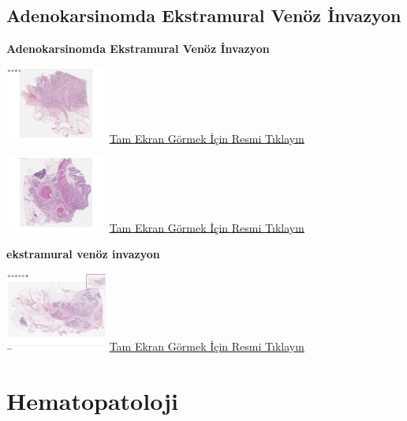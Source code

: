 \documentclass[
  letterpaper,
  DIV=11,
  numbers=noendperiod]{scrreprt}
\begin{document}
\hypertarget{sec-adenokarsinomda-ekstramural-venoz-invazyon}{%
\chapter{Adenokarsinomda Ekstramural Venöz
İnvazyon}\label{sec-adenokarsinomda-ekstramural-venoz-invazyon}}

\textbf{Adenokarsinomda Ekstramural Venöz İnvazyon}

\href{https://images.patolojiatlasi.com/extramuralvenousinvasion/HE.html}{\includegraphics[width=0.25\textwidth,height=\textheight]{./screenshots/extramuralvenousinvasion_screenshot.png}}
\href{https://images.patolojiatlasi.com/extramuralvenousinvasion/HE.html}{Tam
Ekran Görmek İçin Resmi Tıklayın}

\href{https://images.patolojiatlasi.com/extramuralvenousinvasion/HE2.html}{\includegraphics[width=0.25\textwidth,height=\textheight]{./screenshots/extramuralvenousinvasion-2_screenshot.png}}
\href{https://images.patolojiatlasi.com/extramuralvenousinvasion/HE2.html}{Tam
Ekran Görmek İçin Resmi Tıklayın}

\textbf{ekstramural venöz invazyon}

\href{https://images.patolojiatlasi.com/extramural-venous-invasion/HE.html}{\includegraphics[width=0.25\textwidth,height=\textheight]{./screenshots/extramural-venous-invasion_screenshot.png}}
\href{https://images.patolojiatlasi.com/extramural-venous-invasion/HE.html}{Tam
Ekran Görmek İçin Resmi Tıklayın}

\part{Hematopatoloji}
\end{document}
